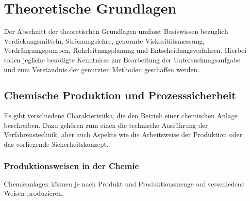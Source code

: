 \newpage
\section{Theoretische Grundlagen}
\label{sec:grundlagen}

Der Abschnitt der theoretischen Grundlagen umfasst Basiswissen bezüglich Verdickungsmitteln, Strömungslehre, genormte Viskositätsmessung, Verdrängungspumpen, Rohrleitungsplanung und Entscheidungsverfahren. Hierbei sollen jegliche benötigte Kenntnisse zur Bearbeitung der Untersuchungsaufgabe und zum Verständnis der genutzten Methoden geschaffen werden.


\subsection{Chemische Produktion und Prozesssicherheit}
Es gibt verschiedene Charakteristika, die den Betrieb einer chemischen Anlage beschreiben. Dazu gehören zum einen die technische Ausführung der Verfahrenstechnik, aber auch Aspekte wie die Arbeitsweise der Produktion oder das vorliegende Sicherheitskonzept.

\subsubsection{Produktionsweisen in der Chemie}
Chemieanlagen können je nach Produkt und Produktionsmenge auf verschiedene Weisen produzieren. 

